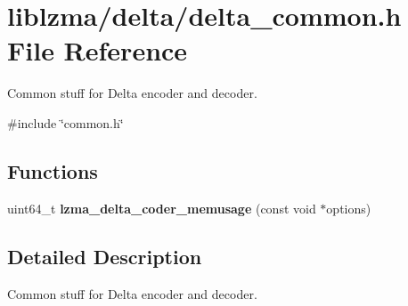 \section{liblzma/delta/delta\+\_\+common.h File Reference}
\label{delta__common_8h}


Common stuff for Delta encoder and decoder.  


{\ttfamily \#include \char`\"{}common.\+h\char`\"{}}\newline
\subsection*{Functions}
\begin{DoxyCompactItemize}
\item 
\mbox{\label{delta__common_8h_aa2e090c4f9f8f30d83007a5f2053bf9f}} 
uint64\+\_\+t {\bfseries lzma\+\_\+delta\+\_\+coder\+\_\+memusage} (const void $\ast$options)
\end{DoxyCompactItemize}


\subsection{Detailed Description}
Common stuff for Delta encoder and decoder. 

